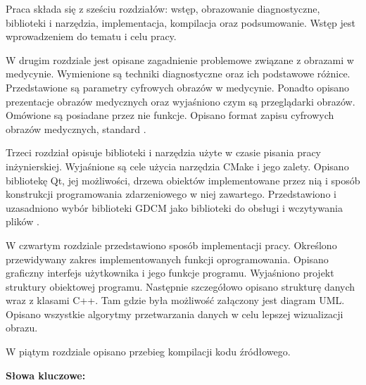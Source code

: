 \begin{center}
\large \bf
\thetitle
\end{center}

Praca składa się z sześciu rozdziałów: wstęp, obrazowanie diagnostyczne, biblioteki i narzędzia, implementacja, kompilacja oraz podsumowanie.
Wstęp jest wprowadzeniem do tematu i celu pracy.
\par
W drugim rozdziale jest opisane zagadnienie problemowe związane z obrazami w medycynie.
Wymienione są techniki diagnostyczne oraz ich podstawowe różnice.
Przedstawione są parametry cyfrowych obrazów w medycynie.
Ponadto opisano prezentacje obrazów medycznych oraz wyjaśniono czym są przeglądarki obrazów.
Omówione są posiadane przez nie funkcje.
Opisano format zapisu cyfrowych obrazów medycznych, standard \DICOM.
\par
Trzeci rozdział opisuje biblioteki i narzędzia użyte w czasie pisania pracy inżynierskiej.
Wyjaśnione są cele użycia narzędzia CMake i jego zalety.
Opisano bibliotekę Qt, jej możliwości, drzewa obiektów implementowane przez nią i sposób konstrukcji programowania zdarzeniowego w niej zawartego.
Przedstawiono i uzasadniono wybór biblioteki GDCM jako biblioteki do obsługi i wczytywania plików \DICOM.
\par
W czwartym rozdziale przedstawiono sposób implementacji pracy.
Określono przewidywany zakres implementowanych funkcji oprogramowania.
Opisano graficzny interfejs użytkownika i jego funkcje programu.
Wyjaśniono projekt struktury obiektowej programu.
Następnie szczegółowo opisano strukturę danych wraz z klasami C++.
Tam gdzie była możliwość załączony jest diagram UML.
Opisano wszystkie algorytmy przetwarzania danych w celu lepszej wizualizacji obrazu.
\par
W piątym rozdziale opisano przebieg kompilacji kodu źródłowego.

\bigskip
{\noindent\bf Słowa kluczowe:} \keywords

\vfill